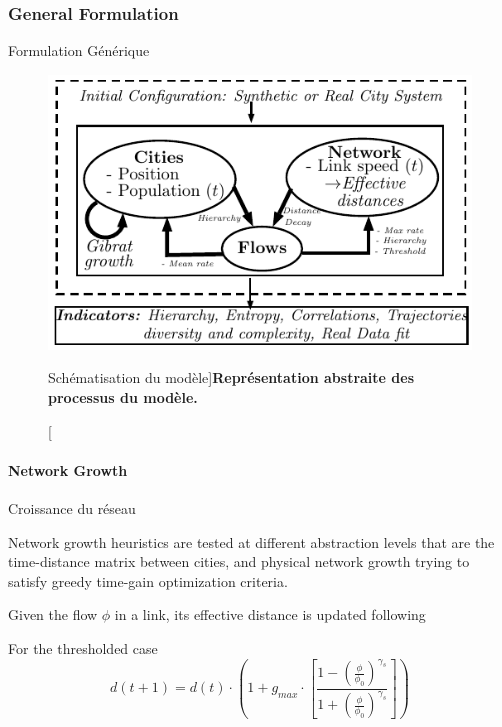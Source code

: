 \subsubsection{General Formulation}{Formulation Générique}




\begin{figure}
\includegraphics[width=\linewidth]{Figures/MacroCoEvolModel/model}
\caption[][Schématisation du modèle]{}{\textbf{Représentation abstraite des processus du modèle.}\label{fig:macrocoevolmodel:model}}
\end{figure}








\paragraph{Network Growth}{Croissance du réseau}



Network growth heuristics are tested at different abstraction levels that are the time-distance matrix between cities, and physical network growth trying to satisfy greedy time-gain optimization criteria.

Given the flow $\phi$ in a link, its effective distance is updated following

For the thresholded case
\[
d(t+1) = d(t)\cdot \left( 1 + g_{max} \cdot \left[\frac{1 - \left(\frac{\phi}{\phi_0}\right)^{\gamma_s}}{1 + \left(\frac{\phi}{\phi_0}\right)^{\gamma_s}}\right]\right)
\]

